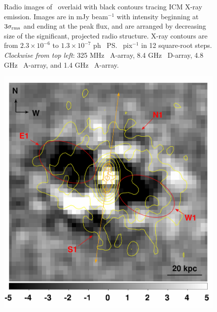 \begin{figure}
\begin{center}
\begin{minipage}{0.495\linewidth}
    \end{minipage}
     \caption{Radio images of \rbs\ overlaid with black contours
       tracing ICM X-ray emission. Images are in mJy beam$^{-1}$ with
       intensity beginning at $3\sigma_{\rm{rms}}$ and ending at the
       peak flux, and are arranged by decreasing size of the
       significant, projected radio structure. X-ray contours are from
       $2.3 \times 10^{-6}$ to $1.3 \times 10^{-7}$ ph
       \pcmsq\ \ps\ pix$^{-1}$ in 12 square-root steps. {\it{Clockwise
           from top left}}: 325 MHz \vla\ A-array, 8.4 GHz
       \vla\ D-array, 4.8 GHz \vla\ A-array, and 1.4 GHz
       \vla\ A-array.}
    \label{fig:composite}
  \end{center}
\end{figure}

\begin{figure}
  \begin{center}
    \begin{minipage}{0.495\linewidth}
      \includegraphics*[width=\textwidth, trim=0mm 0mm 0mm 0mm, clip]{arx_sub_inner.ps}
    \end{minipage}
    \begin{minipage}{0.495\linewidth}

\end{minipage}
\end{center}
\end{figure}
